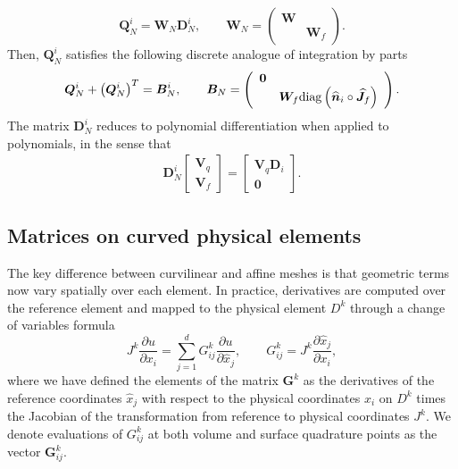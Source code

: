 \documentclass[10pt]{amsart}
\theoremstyle{definition}
\theoremstyle{lemma}
\theoremstyle{theorem}
\theoremstyle{assumption}
\renewcommand{\hat}{\widehat}
\newcommand{\pd}[2]{\frac{\partial#1}{\partial#2}}
\newcommand{\LRp}[1]{\left( #1 \right)}
\newcommand{\LRs}[1]{\left[ #1 \right]}
\newcommand{\diag}[1]{{\rm diag}\LRp{#1}}
\begin{document}
{\[
\bm{Q}_N^i = \bm{W}_N \bm{D}_N^i, \qquad \bm{W}_N = \LRp{\begin{array}{cc}
\bm{W} &\\
& \bm{W}_f 
\end{array}}.
\]
Then, $\bm{Q}_N^i$ satisfies the following discrete analogue of integration by parts 
\begin{equation}
\bm{Q}_N^i + \LRp{\bm{Q}_N^i}^T = \bm{B}^i_N, \qquad \bm{B}_N = \LRp{\begin{array}{cc}
\bm{0}&\\
      & \bm{W}_f \diag{\hat{\bm{n}}_i\circ\hat{\bm{J}}_f}
\end{array}}.
\label{eq:sbpprop1}
\end{equation}
The matrix $\bm{D}_N^i$ reduces to polynomial differentiation when applied to polynomials, in the sense that
\begin{align}
\bm{D}_N^i \LRs{\begin{array}{c}
\bm{V}_q\\
\bm{V}_f
\end{array}} = \LRs{\begin{array}{c}
\bm{V}_q\bm{D}_i\\
\bm{0}
\end{array}}.
\label{eq:dnvqvf}
\end{align}


\subsection{Matrices on curved physical elements}
\label{sec:curv}

The key difference between curvilinear and affine meshes is that geometric terms now vary spatially over each element.  In practice, derivatives are computed over the reference element and mapped to the physical element $D^k$ through a change of variables formula
\[
J^k \pd{u}{x_i} = \sum_{j=1}^d G^k_{ij}\pd{u}{\hat{x}_j}, \qquad G^k_{ij} = J^k\pd{\hat{x}_j}{x_i},
\]
where we have defined the elements of the matrix $\bm{G}^k$ as the derivatives of the reference coordinates $\hat{x}_j$ with respect to the physical coordinates $x_i$ on $D^k$ times the Jacobian of the transformation from reference to physical coordinates $J^k$.  We denote evaluations of $G^k_{ij}$ at both volume and surface quadrature points as the vector $\bm{G}^k_{ij}$.

}
\end{document}
